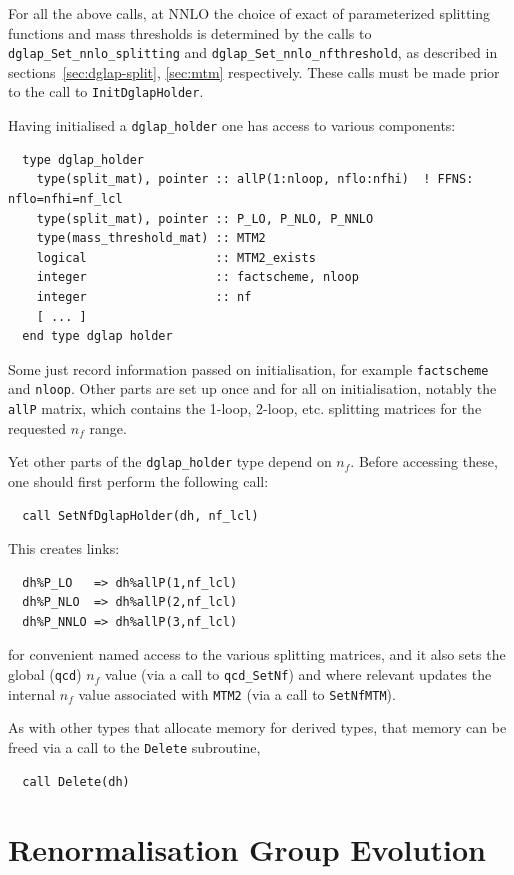 \documentclass[12pt]{article}
\newcommand{\ttt}[1]{\texttt{#1}}
\begin{document}
For all the above calls, at NNLO the choice of exact of parameterized
splitting functions and mass thresholds is determined by the calls to
\ttt{dglap\_Set\_nnlo\_splitting} and
\ttt{dglap\_Set\_nnlo\_nfthreshold}, as described in
sections~\ref{sec:dglap-split}, \ref{sec:mtm} respectively. These
calls must be made prior to the call to \ttt{InitDglapHolder}.

Having initialised a \ttt{dglap\_holder} one has access to various components:
\begin{verbatim}
  type dglap_holder
    type(split_mat), pointer :: allP(1:nloop, nflo:nfhi)  ! FFNS: nflo=nfhi=nf_lcl
    type(split_mat), pointer :: P_LO, P_NLO, P_NNLO
    type(mass_threshold_mat) :: MTM2
    logical                  :: MTM2_exists
    integer                  :: factscheme, nloop
    integer                  :: nf
    [ ... ]
  end type dglap holder
\end{verbatim}
Some just record information passed on initialisation, for example
\ttt{factscheme} and \ttt{nloop}. Other parts are set up once and for
all on initialisation, notably the \ttt{allP} matrix, which contains
the 1-loop, 2-loop, etc. splitting matrices for the requested $n_f$
range.

Yet other parts of the \ttt{dglap\_holder} type depend on $n_f$.
Before accessing these, one should first perform the following call:
\begin{verbatim}
  call SetNfDglapHolder(dh, nf_lcl)
\end{verbatim}
This creates links:
\begin{verbatim}
  dh%P_LO   => dh%allP(1,nf_lcl)
  dh%P_NLO  => dh%allP(2,nf_lcl)
  dh%P_NNLO => dh%allP(3,nf_lcl)
\end{verbatim}
for convenient named access to the various splitting matrices, and it
also sets the global (\ttt{qcd}) $n_f$ value (via a call to
\ttt{qcd\_SetNf}) and where relevant updates the internal $n_f$ value
associated with \ttt{MTM2} (via a call to \ttt{SetNfMTM}).

As with other types that allocate memory for derived types, that
memory can be freed via a call to the \ttt{Delete} subroutine,
\begin{verbatim}
  call Delete(dh)
\end{verbatim}

\section{Renormalisation Group Evolution}
\end{document}
